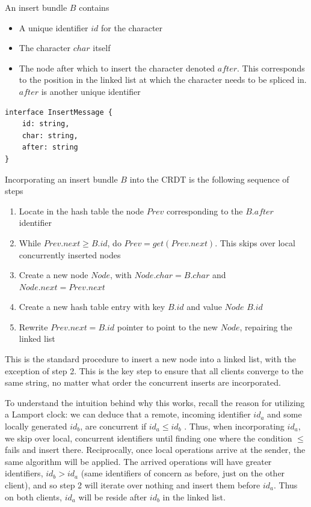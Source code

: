 \documentclass[12pt,a4paper,twoside,openright]{report}
\begin{document}
				An insert bundle $B$ contains
				\begin{itemize}
					\item A unique identifier $id$ for the character
					\item The character $char$ itself
					\item The node after which to insert the character denoted $after$. This corresponds to the position in the linked list at which the character needs to be spliced in. $after$ is another unique identifier
				\end{itemize}
			
\vspace{3mm}	
\begin{lstlisting}[caption=Insert Bundle Type Signature]
interface InsertMessage {
    id: string,
    char: string,
    after: string
}
\end{lstlisting}
				
				Incorporating an insert bundle $B$ into the CRDT is the following sequence of steps
				\begin{enumerate}
					\item Locate in the hash table the node $Prev$ corresponding to the $B.after$ identifier
					\item While $Prev.next \geq B.id$, do $Prev = get(Prev.next)$. This skips over local concurrently inserted nodes
					\item Create a new node $Node$, with $Node.char = B.char$ and $Node.next = Prev.next$
					\item Create a new hash table entry with key $B.id$ and value $Node$ $B.id$
					\item Rewrite $Prev.next = B.id$ pointer to point to the new $Node$, repairing the linked list
				\end{enumerate}
				
				This is the standard procedure to insert a new node into a linked list, with the exception of step 2. This is the key step to ensure that all clients converge to the same string, no matter what order the concurrent inserts are incorporated.
				
				To understand the intuition behind why this works, recall the reason for utilizing a Lamport clock: we can deduce that a remote, incoming identifier $id_a$ and some locally generated $id_b$, are concurrent if $id_a \leq id_b$ . Thus, when incorporating $id_a$, we skip over local, concurrent identifiers until finding one where the condition $\leq$ fails and insert there. Reciprocally, once local operations arrive at the sender, the same algorithm will be applied. The arrived operations will have greater identifiers, $id_b > id_a$ (same identifiers of concern as before, just on the other client), and so step 2 will iterate over nothing and insert them before $id_a$. Thus on both clients, $id_a$ will be reside after $id_b$ in the linked list.
				
\end{document}
